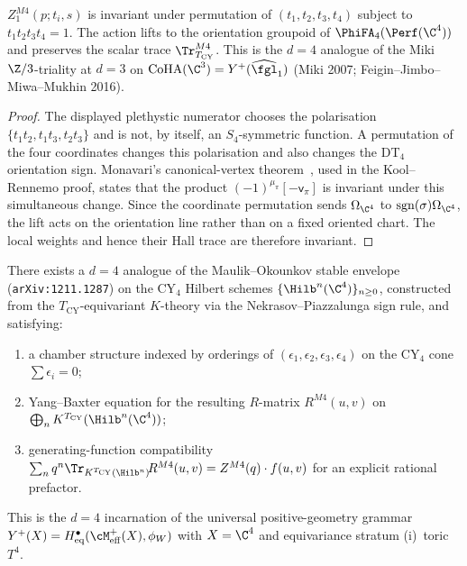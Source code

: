 \begin{proposition}[$S_4$-symmetry at \texorpdfstring{$d = 4$}{d=4}]
\label{prop:s4-symmetry-d4-qgr}
$Z^{M4}_{1}(p;t_i,s)$ is invariant under permutation of
$(t_1,t_2,t_3,t_4)$ subject to $t_1t_2t_3t_4=1$. The action lifts to the
orientation groupoid of $\PhiFA_4(\Perf(\C^4))$ and preserves the scalar
trace $\Tr^{M4}_{T_{\mathrm{CY}}}$. This is the $d = 4$ analogue of the
Miki $\Z/3$-triality at $d = 3$ on
$\mathrm{CoHA}(\C^3) = Y^+(\widehat{\fgl}_1)$ (Miki 2007;
Feigin--Jimbo--Miwa--Mukhin 2016).
\end{proposition}

\begin{proof}
The displayed plethystic numerator chooses the polarisation
$\{t_1t_2,t_1t_3,t_2t_3\}$ and is not, by itself, an $S_4$-symmetric
function. A permutation of the four coordinates changes this
polarisation and also changes the DT$_4$ orientation sign. Monavari's
canonical-vertex theorem~\cite{Monavari2022}, used in the
Kool--Rennemo proof, states that
the product $(-1)^{\mu_\pi}[-\mathsf v_\pi]$ is invariant under this
simultaneous change. Since the coordinate permutation sends
$\Omega_{\C^4}$ to $\mathrm{sgn}(\sigma)\Omega_{\C^4}$, the lift acts on
the orientation line rather than on a fixed oriented chart. The local
weights and hence their Hall trace are therefore invariant.
\end{proof}

\begin{conjecture}[Maulik--Okounkov envelope at \texorpdfstring{$d = 4$}{d=4}]
\label{conj:mo-envelope-d4-qgr}
There exists a $d = 4$ analogue of the Maulik--Okounkov stable envelope
(\texttt{arXiv:1211.1287}) on the CY$_4$ Hilbert schemes
$\{\Hilb^n(\C^4)\}_{n \geq 0}$, constructed from the
$T_{\mathrm{CY}}$-equivariant $K$-theory via the Nekrasov--Piazzalunga
sign rule, and satisfying:
\begin{enumerate}[label=(\roman*)]
 \item a chamber structure indexed by orderings of
 $(\epsilon_1, \epsilon_2, \epsilon_3, \epsilon_4)$ on the CY$_4$ cone
 $\sum \epsilon_i = 0$;
 \item Yang--Baxter equation for the resulting $R$-matrix
 $R^{M4}(u, v)$ on
 $\bigoplus_n K^{T_{\mathrm{CY}}}(\Hilb^n(\C^4))$;
 \item generating-function compatibility
 $\sum_n q^n \Tr_{K^{T_{\mathrm{CY}}}(\Hilb^n)}\! R^{M4}(u, v)
 = Z^{M4}(q) \cdot f(u, v)$ for an explicit rational prefactor.
\end{enumerate}
This is the $d = 4$ incarnation of the universal positive-geometry
grammar $Y^+(X) = H^\bullet_{\mathrm{eq}}(\cM^+_{\mathrm{eff}}(X), \phi_W)$
with $X = \C^4$ and equivariance stratum (i)~toric $T^4$.
\end{conjecture}

